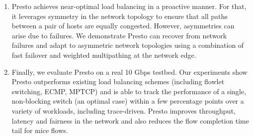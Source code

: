 \begin{enumerate}
\item Presto achieves near-optimal load balancing in a proactive manner. For that, it leverages symmetry in 
the network topology to ensure that all paths between a pair of hosts are equally congested. 
However, asymmetries can arise due to failures. We demonstrate Presto can recover from network failures and adapt to asymmetric 
network topologies using a combination of fast failover and weighted multipathing at the network edge.


\item Finally, we evaluate Presto on a real 10 Gbps testbed. Our experiments show Presto
outperforms existing load balancing schemes (including flowlet switching, ECMP, MPTCP) and 
is able to track the performance of a single, non-blocking switch (an optimal case) within a few percentage points
over a variety of workloads, including trace-driven. Presto improves throughput, latency and fairness in the network and 
also reduces the flow completion time tail for mice flows.

\end{enumerate}


